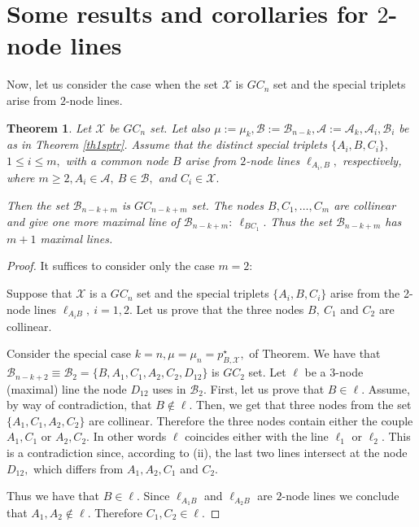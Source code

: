 \documentclass[a4paper,12pt]{article}
\newtheorem{theorem}[lemma]{Theorem}
\theoremstyle{definition}
\numberwithin{equation}{section}
\numberwithin{figure}{section}
\newcommand{\Aset}{\mathcal{A}}
\newcommand{\Bset}{\mathcal{B}}
\newcommand{\Xset}{\mathcal{X}}
\begin{document}
\section{Some results and corollaries for $2$-node lines}
Now, let us consider the case when the set $\Xset$ is $GC_n$ set and the special triplets arise from $2$-node lines.
\begin{theorem}\label{avel+}
Let $\Xset$ be $GC_n$ set. Let also $\mu:=\mu_k, \Bset:=\Bset_{n-k},\Aset:=\Aset_{k}, \Aset_i, \Bset_i$ be as in Theorem \ref{th1sptr}. 
Assume that the distinct special triplets $\{A_i,B,C_i\},$ $1\le i\le m,$ with a common node $B$ arise from $2$-node lines $\ell_{A_i,B},$ respectively, where $m\ge 2, A_i \in \Aset,\ B\in \Bset,$ and $C_i \in \Xset.$ 

Then the set $\Bset_{n-k+m}$ is $GC_{n-k+m}$ set. The nodes $B,C_1,\ldots, C_m$ are collinear and give one more maximal line of $\Bset_{n-k+m}: \ \ell_{BC_1}.$  Thus the set $\Bset_{n-k+m}$ has $m+1$ maximal lines.
\end{theorem}
\begin{proof}
It suffices to consider only the case $m=2:$

Suppose that $\Xset$ is a $GC_n$ set and the special triplets $\{A_i, B, C_i\}$ arise from the 2-node lines $\ell_{A_iB},\ i=1,2.$ Let us prove that the three nodes $B,\ C_1$ and $C_2$ are collinear. 

Consider the special case  
$k=n, \mu=\mu_n=p^\star_{B,\Xset},$
of Theorem. We have that  
$\Bset_{n-k+2}\equiv \Bset_2=\{B,A_1,C_1,A_2,C_2,D_{12}\}$ 
is 
$GC_2$ set. Let $\ell$ be a $3$-node (maximal) line the node $D_{12}$ uses in $\Bset_2.$ First, let us prove that $B\in \ell.$ Assume, by way of contradiction, that $B\notin \ell.$ Then, we get that three nodes from the set  $\{A_1,C_1,A_2,C_2\}$ are collinear. Therefore the three nodes contain either the couple $A_1,C_1$  or $A_2,C_2.$ In other words $\ell$ coincides either with the line $\ell_1$ or $\ell_2.$ This is a contradiction since, according to (ii),  the last two lines intersect at the node $D_{12},$ which differs from $A_1, A_2, C_1$ and $C_2.$

Thus we have that $B\in \ell.$ Since $\ell_{A_1B}$ and   $\ell_{A_2B}$ are $2$-node lines we conclude that $A_1,A_2\notin \ell.$ Therefore $C_1,C_2\in \ell.$
\end{proof}
\end{document}
